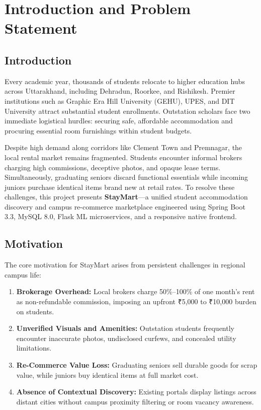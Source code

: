 \chapter{Introduction and Problem Statement}

\section{Introduction}
Every academic year, thousands of students relocate to higher education hubs across Uttarakhand, including Dehradun, Roorkee, and Rishikesh. Premier institutions such as Graphic Era Hill University (GEHU), UPES, and DIT University attract substantial student enrollments. Outstation scholars face two immediate logistical hurdles: securing safe, affordable accommodation and procuring essential room furnishings within student budgets.

Despite high demand along corridors like Clement Town and Premnagar, the local rental market remains fragmented. Students encounter informal brokers charging high commissions, deceptive photos, and opaque lease terms. Simultaneously, graduating seniors discard functional essentials while incoming juniors purchase identical items brand new at retail rates. To resolve these challenges, this project presents \textbf{StayMart}—a unified student accommodation discovery and campus re-commerce marketplace engineered using Spring Boot 3.3, MySQL 8.0, Flask ML microservices, and a responsive native frontend.

\section{Motivation}
The core motivation for StayMart arises from persistent challenges in regional campus life:
\begin{enumerate}
    \item \textbf{Brokerage Overhead:} Local brokers charge 50\%--100\% of one month's rent as non-refundable commission, imposing an upfront ₹5,000 to ₹10,000 burden on students.
    \item \textbf{Unverified Visuals and Amenities:} Outstation students frequently encounter inaccurate photos, undisclosed curfews, and concealed utility limitations.
    \item \textbf{Re-Commerce Value Loss:} Graduating seniors sell durable goods for scrap value, while juniors buy identical items at full market cost.
    \item \textbf{Absence of Contextual Discovery:} Existing portals display listings across distant cities without campus proximity filtering or room vacancy awareness.
\end{enumerate}

